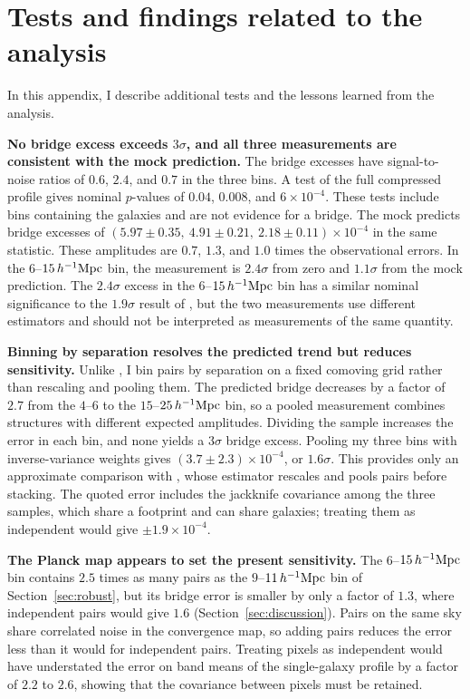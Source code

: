 \documentclass[11pt,letterpaper]{article}
\newcommand{\hinvMpc}{h^{-1}{\rm Mpc}}
\begin{document}
\appendix

\section{Tests and findings related to the analysis}
\label{sec:appendix}

In this appendix, I describe additional tests and the lessons learned from the analysis.

\textbf{No bridge excess exceeds $3\sigma$, and all three measurements are
consistent with the mock prediction.} The bridge excesses have
signal-to-noise ratios of $0.6$, $2.4$, and $0.7$ in the three bins. A
test of the full compressed profile gives nominal $p$-values of $0.04$,
$0.008$, and $6\times10^{-4}$.
These tests include bins containing the galaxies and
are not evidence for a bridge. The mock predicts bridge excesses of
$(5.97\pm0.35,\allowbreak\ 4.91\pm0.21,\allowbreak\ 2.18\pm0.11)\times10^{-4}$ in the
same statistic. These amplitudes are $0.7$, $1.3$, and $1.0$ times the
observational errors. In the $6$--$15\,\hinvMpc$ bin, the measurement is $2.4\sigma$
from zero and $1.1\sigma$ from the mock prediction.
The $2.4\sigma$ excess in the $6$--$15\,\hinvMpc$ bin has a similar nominal significance
to the $1.9\sigma$ result of \citet{deGraaff2019}, but the two measurements
use different estimators and should not be interpreted as measurements of
the same quantity.

\textbf{Binning by separation resolves the predicted trend but reduces
sensitivity.} Unlike \citet{deGraaff2019}, I bin pairs by separation on a
fixed comoving grid rather than rescaling and pooling them. The predicted
bridge decreases by a factor of $2.7$ from the $4$--$6$ to the $15$--$25\,\hinvMpc$ bin, so a pooled
measurement combines structures with different expected amplitudes. Dividing
the sample increases the error in each bin, and none yields a $3\sigma$
bridge excess. Pooling my three bins with inverse-variance weights gives
$(3.7\pm2.3)\times10^{-4}$, or $1.6\sigma$. This provides only an
approximate comparison with \citet{deGraaff2019}, whose estimator rescales and
pools pairs before stacking. The quoted error includes the jackknife
covariance among the three samples, which share a footprint and can share
galaxies; treating them as independent would give $\pm1.9\times10^{-4}$.

\textbf{The Planck map appears to set the present sensitivity.} The
$6$--$15\,\hinvMpc$ bin contains $2.5$ times as many pairs as the
$9$--$11\,\hinvMpc$ bin of Section~\ref{sec:robust}, but its bridge error is
smaller by only a factor of $1.3$, where independent pairs would give $1.6$
(Section~\ref{sec:discussion}). Pairs on the same sky share correlated noise
in the convergence map, so adding pairs reduces the error less than it would
for independent pairs. Treating pixels as independent would have understated
the error on band means of the single-galaxy profile by a factor of $2.2$
to $2.6$,
showing that the covariance between pixels must be retained.
\end{document}
